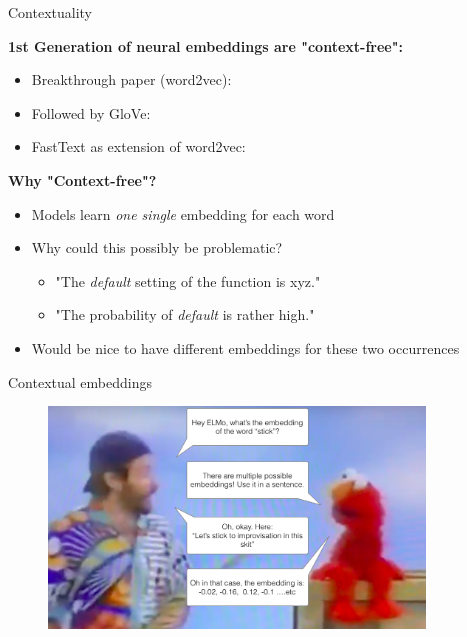 \begin{vbframe}{Contextuality}

\vfill

\textbf{1st Generation of neural embeddings are "context-free":}

	\begin{itemize}
		\item Breakthrough paper (word2vec): 
		\item Followed by GloVe: 
		\item FastText as extension of word2vec: 
	\end{itemize}
	
	\textbf{Why "Context-free"?}
	
	\begin{itemize}
		\item Models learn \textit{one single} embedding for each word
		\item Why could this possibly be problematic?
			\begin{itemize}
				\item "The \textit{default} setting of the function is xyz."
				\item "The probability of \textit{default} is rather high."
			\end{itemize}
		\item Would be nice to have different embeddings for these two occurrences
	\end{itemize}
	
\vfill

\end{vbframe}


\begin{vbframe}{Contextual embeddings}

\vfill

	\begin{figure}
		\centering
		\includegraphics[width = 10cm]{figure/elmo-embedding-robin-williams.png}\\ 
	\end{figure}

\vfill

\end{vbframe}

